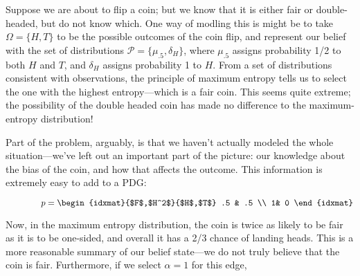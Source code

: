 \begin{example}
Suppose we are about to flip a coin; but we know that it is either fair or double-headed, but do not know which.
One way of modling this is might be to take $\Omega = \{ H, T\}$ to be the possible outcomes of the coin flip, and represent our belief with the set of distributions
$\mathcal P = \{ \mu_{.5}, \delta_H \}$, where $\mu_{.5}$ assigns probability 1/2 to both $H$ and $T$, and $\delta_H$ assigns probability 1 to $H$. 
From a set of distributions consistent with observations, the principle of maximum entropy tells us to select the one with the highest entropy---which is a fair coin. 
This seems quite extreme; the possibility of the double headed coin has made no difference to the maximum-entropy distribution!


Part of the problem, arguably, is that we haven't actually modeled the whole situation---we've left out an important part of the picture: our knowledge about the bias of the coin, and how that affects the outcome.  This information is extremely easy to add to a PDG: 

\begin{center}
$\qquad\qquad\displaystyle
p = 
\begin{idxmat}{$F$,$H^2$}{$H$,$T$}
    .5 & .5 \\ 1& 0
\end{idxmat}
$
\end{center}

Now, in the maximum entropy distribution, the coin is twice as likely to be fair as it is to be one-sided, and overall it has a 2/3 chance of landing heads. 
This is a more reasonable summary of our belief state---we do not truly believe that the coin is fair.
Furthermore, if we select $\alpha = 1$ for this edge, 
\end{example}

